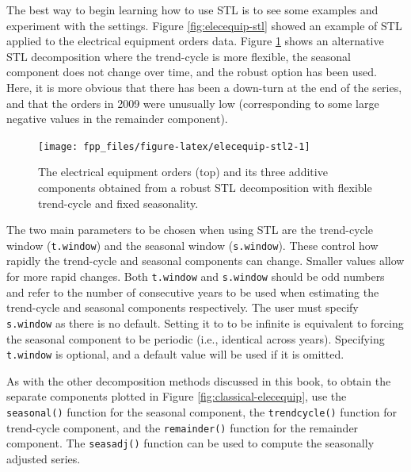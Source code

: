 \documentclass[]{book}
\newenvironment{Shaded}{\begin{snugshade}}{\end{snugshade}}
\newcommand{\DataTypeTok}[1]{\textcolor[rgb]{0.13,0.29,0.53}{#1}}
\newcommand{\DecValTok}[1]{\textcolor[rgb]{0.00,0.00,0.81}{#1}}
\newcommand{\KeywordTok}[1]{\textcolor[rgb]{0.13,0.29,0.53}{\textbf{#1}}}
\newcommand{\NormalTok}[1]{#1}
\newcommand{\OperatorTok}[1]{\textcolor[rgb]{0.81,0.36,0.00}{\textbf{#1}}}
\newcommand{\OtherTok}[1]{\textcolor[rgb]{0.56,0.35,0.01}{#1}}
\newcommand{\StringTok}[1]{\textcolor[rgb]{0.31,0.60,0.02}{#1}}
\begin{document}
The best way to begin learning how to use STL is to see some examples and experiment with the settings. Figure \ref{fig:elecequip-stl} showed an example of STL applied to the electrical equipment orders data. Figure \ref{fig:elecequip-stl2} shows an alternative STL decomposition where the trend-cycle is more flexible, the seasonal component does not change over time, and the robust option has been used. Here, it is more obvious that there has been a down-turn at the end of the series, and that the orders in 2009 were unusually low (corresponding to some large negative values in the remainder component).

\begin{Shaded}
\end{Shaded}

\begin{figure}

{\centering \texttt{[image: fpp\_files/figure-latex/elecequip-stl2-1]} 

}

\caption{The electrical equipment orders (top) and its three additive components obtained from a robust STL decomposition with flexible trend-cycle and fixed seasonality.}\label{fig:elecequip-stl2}
\end{figure}

The two main parameters to be chosen when using STL are the trend-cycle window (\texttt{t.window}) and the seasonal window (\texttt{s.window}). These control how rapidly the trend-cycle and seasonal components can change. Smaller values allow for more rapid changes. Both \texttt{t.window} and \texttt{s.window} should be odd numbers and refer to the number of consecutive years to be used when estimating the trend-cycle and seasonal components respectively. The user must specify \texttt{s.window} as there is no default. Setting it to to be infinite is equivalent to forcing the seasonal component to be periodic (i.e., identical across years). Specifying \texttt{t.window} is optional, and a default value will be used if it is omitted.

As with the other decomposition methods discussed in this book, to obtain the separate components plotted in Figure \ref{fig:classical-elecequip}, use the \texttt{seasonal()} function for the seasonal component, the \texttt{trendcycle()} function for trend-cycle component, and the \texttt{remainder()} function for the remainder component. The \texttt{seasadj()} function can be used to compute the seasonally adjusted series.
\end{document}
